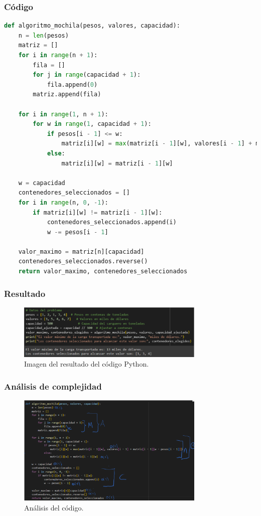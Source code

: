 \subsubsection{Código}
\begin{lstlisting}[language=Python]
def algoritmo_mochila(pesos, valores, capacidad):
    n = len(pesos)
    matriz = []
    for i in range(n + 1):
        fila = []
        for j in range(capacidad + 1):
            fila.append(0)
        matriz.append(fila)

    for i in range(1, n + 1):
        for w in range(1, capacidad + 1):
            if pesos[i - 1] <= w:
                matriz[i][w] = max(matriz[i - 1][w], valores[i - 1] + matriz[i - 1][w - pesos[i - 1]])
            else:
                matriz[i][w] = matriz[i - 1][w]

    w = capacidad
    contenedores_seleccionados = []
    for i in range(n, 0, -1):
        if matriz[i][w] != matriz[i - 1][w]:
            contenedores_seleccionados.append(i)
            w -= pesos[i - 1]

    valor_maximo = matriz[n][capacidad]
    contenedores_seleccionados.reverse()
    return valor_maximo, contenedores_seleccionados
\end{lstlisting}

\subsubsection{Resultado}
\begin{figure}[H]
    \centering
    \includegraphics[width=0.8\textwidth]{resultado_mochila_ejem1.png}
    \caption{Imagen del resultado del código Python.}
    \label{fig:resultado_ejemplo1}
\end{figure}

\subsubsection{Análisis de complejidad}
\begin{figure}[H]
    \centering
    \includegraphics[width=0.8\textwidth]{complejidad_mochila_ejem1.png}
    \caption{Análisis del código.}
    \label{fig:complejidad_ejemplo1}
\end{figure}

